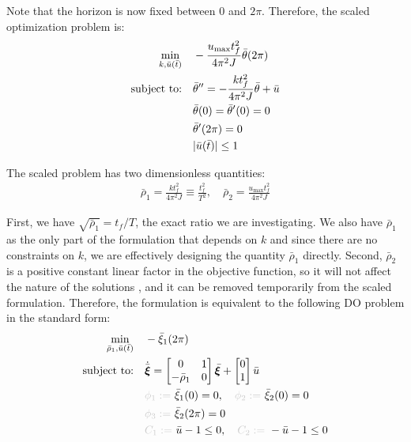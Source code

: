 \noindent Note that the horizon is now fixed between $0$ and $2\pi$. Therefore, the scaled optimization problem is:
\begin{subequations}
\label{eq:ch4:sasa_prob_3}
\begin{align}
\min_{k, \bar{u}(\bar{t})} \quad & - \frac{u_{\max} t_f^2}{4 \pi^2 J}  \bar{\theta}(2\pi) \\
\text{subject to:} \quad & \bar{\theta}''  = - \frac{k t_f^2}{4 \pi^2 J} \bar{\theta} + \bar{u} \\
& \bar{\theta}(0) = \bar{\theta}'(0) = 0 \\
& \bar{\theta}'(2\pi) = 0 \\
& \lvert\bar{u}(\bar{t})\rvert \leq 1
\end{align}
\end{subequations}

\noindent The scaled problem has two dimensionless quantities:
\begin{align}
\bar{\rho}_1 = \frac{k t_f^2}{4 \pi^2 J} \equiv \frac{t_f^2}{T^2}, \quad \bar{\rho}_2 = \frac{u_{\max} t_f^2}{4 \pi^2 J}
\end{align}

\noindent First, we have $\sqrt{\bar{\rho}_1} = t_f/T$, the exact ratio we are investigating.
We also have $\bar{\rho}_1$ as the only part of the formulation that depends on $k$ and since there are no constraints on $k$, we are effectively designing the quantity $\bar{\rho}_1$ directly.
Second, $\bar{\rho}_2$ is a positive constant linear factor in the objective function, so it will not affect the nature of the solutions \cite{Boyd2009a}, and it can be removed temporarily from the scaled formulation.
Therefore, the formulation is equivalent to the following DO problem in the standard form:
\begingroup
\allowdisplaybreaks
\begin{subequations}
\label{eq:ch4:sasa_prob_4}
\begin{align}
\min_{\bar{\rho}_1, \bar{u}(\bar{t})} \quad & - \mybar{\xi}_1(2\pi) \\
\text{subject to:} \quad & \dot{\mybar{\bm{\xi}}} = \begin{bmatrix} 0 & 1 \\ -\bar{\rho}_1 & 0 \end{bmatrix} \mybar{\bm{\xi}} + \begin{bmatrix} 0 \\ 1 \end{bmatrix} \bar{u} \\
& \textcolor{light-gray}{\phi_1 := }\ \mybar{\xi}_1(0) = 0, \quad \textcolor{light-gray}{\phi_2 := }\  \mybar{\xi}_2(0) = 0 \\
& \textcolor{light-gray}{\phi_3 := }\  \mybar{\xi}_2(2\pi) = 0 \\ 
& \textcolor{light-gray}{C_1 := }\  \bar{u} - 1 \leq 0, \quad \textcolor{light-gray}{C_2 := }\ -\bar{u} - 1 \leq 0 
\end{align}
\end{subequations}%
\endgroup

